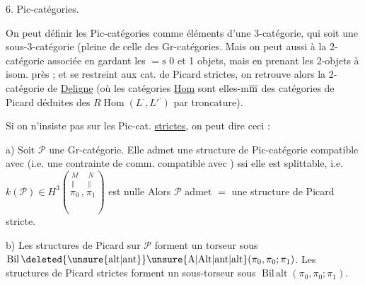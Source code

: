 6. Pic-catégories.

On peut définir les Pic-catégories comme éléments d'une 3-catégorie, qui soit une sous-3-catégorie (pleine  de celle des Gr-catégories.  Mais on peut aussi  à la 2-catégorie associée en gardant les $=\mathrm s$ 0 et 1 objets, mais en prenant les 2-objets à isom. près ;  et  se restreint aux cat. de Picard strictes, on retrouve alors la 2-catégorie de \uline{Deligne} (où les catégories \uline{Hom} sont elles-m$\overline{\rm m}$ des catégories de Picard déduites des $R\operatorname{Hom}(L^{\displaystyle\cdot},L'^{\displaystyle\cdot})$ par troncature).

Si on n'insiste pas sur les Pic-cat. \uline{strictes}, on peut dire ceci :

a) Soit $\mathscr P$ une Gr-catégorie. Elle admet une structure de Pic-catégorie compatible avec  (i.e. une  contrainte de comm. compatible avec ) ssi elle est splittable, i.e. $k(\mathscr P)\in H^3(\overset{\substack{M\\ \Vert}}{\pi_0},\overset{\substack{N\\ \Vert}}{\pi_1})$ est nulle Alors $\mathscr P$ admet $=$ une structure de Picard stricte.

b) Les structures de Picard  sur $\mathscr P$ forment un torseur sous $\operatorname{Bil}\deleted{\unsure{\mathrm{alt}|\mathrm{ant}}}\unsure{\mathrm{A}|\mathrm{Alt}|\mathrm{ant}|\mathrm{alt}}(\pi_0,\pi_0;\pi_1)$. Les structures de Picard strictes forment un sous-torseur sous $\operatorname{Bil\,alt}(\pi_0,\pi_0;\pi_1)$.
